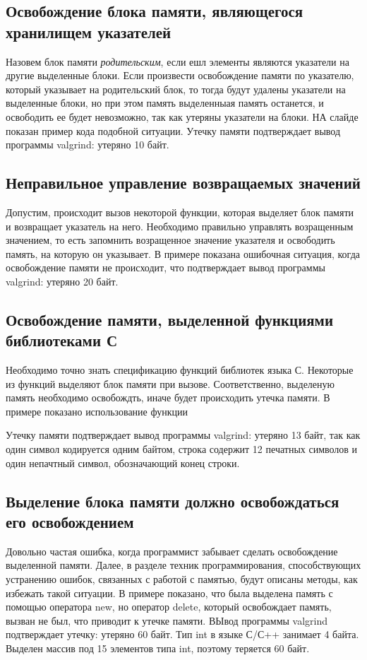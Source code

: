 \documentclass[10pt]{article}
\begin{document}
\subsection{Освобождение блока памяти, являющегося хранилищем указателей}
Назовем блок памяти {\it родительским}, если ешл элементы
являются указатели на другие выделенные блоки. Если произвести освобождение памяти по указателю,
который указывает на родительский блок, то тогда будут удалены указатели на выделенные блоки,
но при этом память выделенныая память останется, и освободить ее будет невозможно, так как утеряны
указатели на блоки. НА слайде показан пример кода подобной ситуации. Утечку памяти подтверждает
вывод программы valgrind: утеряно 10 байт.

\subsection{Неправильное управление возвращаемых значений}
Допустим, происходит вызов некоторой функции, которая выделяет блок памяти
и возвращает указатель на него. Необходимо правильно управлять возращенным значением,
то есть запомнить возращенное значение указателя и освободить память, на которую он указывает.
В примере показана ошибочная ситуация, когда освобождение памяти не происходит, что подтверждает
вывод программы valgrind: утеряно 20 байт.

\subsection{Освобождение памяти, выделенной функциями библиотеками С}
Необходимо точно знать спецификацию функций библиотек языка С. Некоторые из функций
выделяют блок памяти при вызове. Соответственно, выделеную память необходимо освобождть, иначе будет происходить
утечка памяти. В примере показано использование функции

Утечку памяти подтверждает вывод программы valgrind: утеряно 13 байт, так как один символ кодируется одним байтом,
строка содержит 12 печатных символов и один непачтный символ, обозначающий конец строки.


\subsection{Выделение блока памяти должно освобождаться его освобождением}
Довольно частая ошибка, когда программист забывает сделать освобождение выделенной
памяти. Далее, в разделе техник программирования, способствующих устранению ошибок,
связанных с работой с памятью, будут описаны методы, как избежать такой ситуации.
В примере показано, что была выделена память с помощью оператора new, но оператор
delete, который освобождает память, вызван не был, что приводит к утечке памяти.
ВЫвод программы valgrind подтверждает утечку: утеряно 60 байт. Тип int в языке С/С++
занимает 4 байта. Выделен массив под 15 элементов типа int, поэтому теряется 60 байт.
\end{document}
